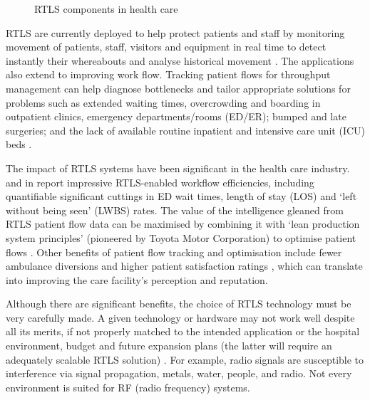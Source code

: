         \begin{figure} [ht!]
        	\centering	
            \caption{RTLS components in health care \cite{boulos2012real}}
            \label{fig:litRev_RTLS_healthcare}
		\end{figure}
        
        RTLS are currently deployed to help protect patients and staff by monitoring movement of patients, staff, visitors and equipment in real time to detect instantly their whereabouts and analyse historical movement \cite{cobbley2011easing}. The applications also extend to improving work flow. Tracking patient flows for throughput management can help diagnose bottlenecks and tailor appropriate solutions for problems such as extended waiting times, overcrowding and boarding in outpatient clinics, emergency departments/rooms (ED/ER); bumped and late surgeries; and the lack of available routine inpatient and intensive care unit (ICU) beds \cite{boulos2012real,stahl2011measuring,drazen2011using,malik2009rtls}.
        
        The impact of RTLS systems have been significant in the health care industry. \citeauthor{laskowski2012rtls} \cite{laskowski2012rtls} and \citeauthor{boulos2012real} in \cite{boulos2012real} report impressive RTLS-enabled workflow efficiencies, including quantifiable significant cuttings in ED wait times, length of stay (LOS) and `left without being seen' (LWBS) rates. The value of the intelligence gleaned from RTLS patient flow data can be maximised by combining it with `lean production system principles' (pioneered by Toyota Motor Corporation) to optimise patient flows \cite{boulos2012real}. Other benefits of patient flow tracking and optimisation include fewer ambulance diversions and higher patient satisfaction ratings \cite{drazen2011using}, which can translate into improving the care facility’s perception and reputation.
        
        Although there are significant benefits, the choice of RTLS technology must be very carefully made. A given technology or hardware may not work well despite all its merits, if not properly matched to the intended application or the hospital environment, budget and future expansion plans (the latter will require an adequately scalable RTLS solution) \cite{boulos2012real}. For example, radio signals are susceptible to interference via signal propagation, metals, water, people, and radio. Not every environment is suited for RF (radio frequency) systems. 
        
